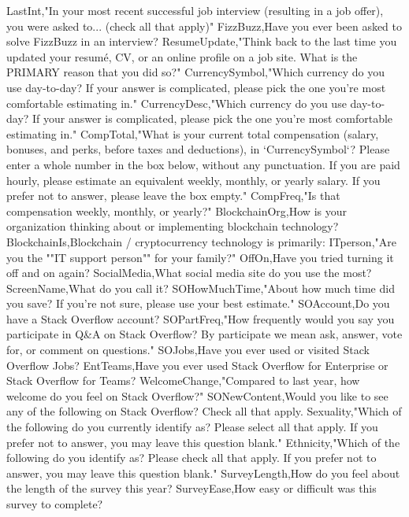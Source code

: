\documentclass{dyplom}
\begin{document}
LastInt,"In your most recent successful job interview (resulting in a job offer), you were asked to... (check all that apply)"
FizzBuzz,Have you ever been asked to solve FizzBuzz in an interview?
ResumeUpdate,"Think back to the last time you updated your resumé, CV, or an online profile on a job site. What is the PRIMARY reason that you did so?"
CurrencySymbol,"Which currency do you use day-to-day? If your answer is complicated, please pick the one you're most comfortable estimating in."
CurrencyDesc,"Which currency do you use day-to-day? If your answer is complicated, please pick the one you're most comfortable estimating in."
CompTotal,"What is your current total compensation (salary, bonuses, and perks, before taxes and deductions), in `CurrencySymbol`? Please enter a whole number in the box below, without any punctuation. If you are paid hourly, please estimate an equivalent weekly, monthly, or yearly salary. If you prefer not to answer, please leave the box empty."
CompFreq,"Is that compensation weekly, monthly, or yearly?"
BlockchainOrg,How is your organization thinking about or implementing blockchain technology?
BlockchainIs,Blockchain / cryptocurrency technology is primarily:
ITperson,"Are you the ""IT support person"" for your family?"
OffOn,Have you tried turning it off and on again?
SocialMedia,What social media site do you use the most?
ScreenName,What do you call it?
SOHowMuchTime,"About how much time did you save? If you're not sure, please use your best estimate."
SOAccount,Do you have a Stack Overflow account?
SOPartFreq,"How frequently would you say you participate in Q&A on Stack Overflow? By participate we mean ask, answer, vote for, or comment on questions."
SOJobs,Have you ever used or visited Stack Overflow Jobs?
EntTeams,Have you ever used Stack Overflow for Enterprise or Stack Overflow for Teams?
WelcomeChange,"Compared to last year, how welcome do you feel on Stack Overflow?"
SONewContent,Would you like to see any of the following on Stack Overflow? Check all that apply.
Sexuality,"Which of the following do you currently identify as? Please select all that apply. If you prefer not to answer, you may leave this question blank."
Ethnicity,"Which of the following do you identify as? Please check all that apply. If you prefer not to answer, you may leave this question blank."
SurveyLength,How do you feel about the length of the survey this year?
SurveyEase,How easy or difficult was this survey to complete?

    \cleardoublepage
    
\end{document}
